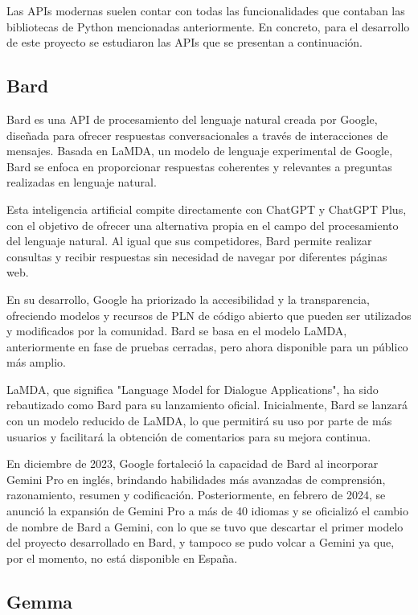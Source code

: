 Las APIs modernas suelen contar con todas las funcionalidades que contaban las bibliotecas de Python mencionadas anteriormente. En concreto, para el desarrollo de este proyecto se estudiaron las APIs que se presentan a continuación.

\subsection{Bard}
Bard es una API de procesamiento del lenguaje natural creada por Google, diseñada para ofrecer respuestas conversacionales a través de interacciones de mensajes. Basada en LaMDA, un modelo de lenguaje experimental de Google, Bard se enfoca en proporcionar respuestas coherentes y relevantes a preguntas realizadas en lenguaje natural.

Esta inteligencia artificial compite directamente con ChatGPT y ChatGPT Plus, con el objetivo de ofrecer una alternativa propia en el campo del procesamiento del lenguaje natural. Al igual que sus competidores, Bard permite realizar consultas y recibir respuestas sin necesidad de navegar por diferentes páginas web.

En su desarrollo, Google ha priorizado la accesibilidad y la transparencia, ofreciendo modelos y recursos de PLN de código abierto que pueden ser utilizados y modificados por la comunidad. Bard se basa en el modelo LaMDA, anteriormente en fase de pruebas cerradas, pero ahora disponible para un público más amplio.

LaMDA, que significa "Language Model for Dialogue Applications", ha sido rebautizado como Bard para su lanzamiento oficial. Inicialmente, Bard se lanzará con un modelo reducido de LaMDA, lo que permitirá su uso por parte de más usuarios y facilitará la obtención de comentarios para su mejora continua.

En diciembre de 2023, Google fortaleció la capacidad de Bard al incorporar Gemini Pro en inglés, brindando habilidades más avanzadas de comprensión, razonamiento, resumen y codificación. Posteriormente, en febrero de 2024, se anunció la expansión de Gemini Pro a más de 40 idiomas y se oficializó el cambio de nombre de Bard a Gemini, con lo que se tuvo que descartar el primer modelo del proyecto desarrollado en Bard, y tampoco se pudo volcar a Gemini ya que, por el momento, no está disponible en España. 
\subsection{Gemma}

